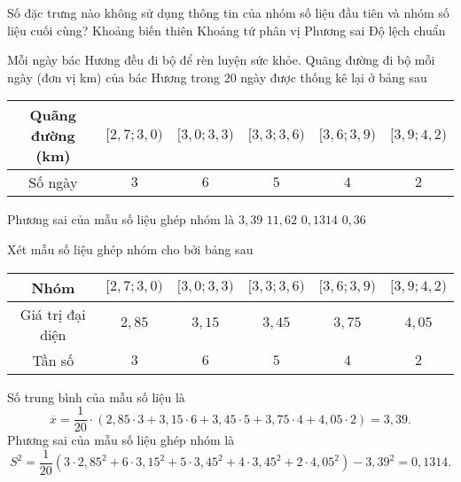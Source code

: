 \begin{ex}
	Số đặc trưng nào không sử dụng thông tin của nhóm số liệu đầu tiên và nhóm số liệu cuối cùng?
	\choice
	{Khoảng biến thiên}
	{\True Khoảng tứ phân vị}
	{Phương sai}
	{Độ lệch chuẩn}
\end{ex}

\begin{ex}%
	Mỗi ngày bác Hương đều đi bộ để rèn luyện sức khỏe. Quãng đường đi bộ mỗi ngày (đơn vị km) của bác Hương trong $20$ ngày được thống kê lại ở bảng sau
	\begin{center}
		\begin{tabular}{|c|c|c|c|c|c|}
			\hline
			Quãng đường (km) & $[2{,}7;3{,}0)$ & $[3{,}0;3{,}3)$ & $[3{,}3;3{,}6)$ & $[3{,}6;3{,}9)$ & $[3{,}9;4{,}2)$ \\
			\hline
			Số ngày          & $3$             & $6$             & $5$             & $4$             & $2$             \\
			\hline
		\end{tabular}
	\end{center}
	Phương sai của mẫu số liệu ghép nhóm là
	\choice
	{$3{,}39$}
	{$11{,}62$}
	{\True $0{,}1314$}
	{$0{,}36$}
	\loigiai
	{
	Xét mẫu số liệu ghép nhóm cho bởi bảng sau
	\begin{center}
		\begin{tabular}{|c|c|c|c|c|c|}
			\hline
			Nhóm             & $[2{,}7;3{,}0)$ & $[3{,}0;3{,}3)$ & $[3{,}3;3{,}6)$ & $[3{,}6;3{,}9)$ & $[3{,}9;4{,}2)$ \\
			\hline
			Giá trị đại diện & $2{,}85$        & $3{,}15$        & $3{,}45$        & $3{,}75$        & $4{,}05$        \\
			\hline
			Tần số           & $3$             & $6$             & $5$             & $4$             & $2$             \\
			\hline
		\end{tabular}
	\end{center}
	Số trung bình của mẫu số liệu là
	$$\overline{x}=\dfrac{1}{20}\cdot (2{,}85\cdot 3+3{,}15\cdot 6+3{,}45\cdot 5+3{,}75\cdot 4+4{,}05\cdot 2)=3{,}39.$$
	Phương sai của mẫu số liệu ghép nhóm là
	$$S^2=\dfrac{1}{20}\left(3\cdot 2{,}85^2+6\cdot 3{,}15^2+5\cdot 3{,}45^2+4\cdot 3{,}45^2+2\cdot 4{,}05^2\right)-3{,}39^2=0{,}1314.$$
	}
\end{ex}


